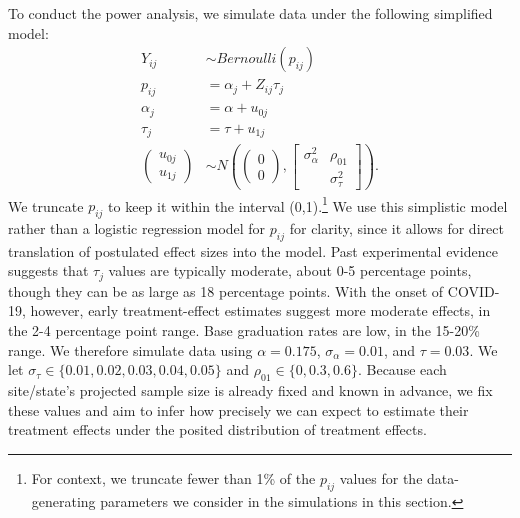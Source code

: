 \documentclass[]{article}
\begin{document}
To conduct the power analysis, we simulate data under the following simplified model:
\begin{align*}
    Y_{ij} &\sim Bernoulli(p_{ij}) \\
    p_{ij} &= \alpha_j + Z_{ij} \tau_j \\
    \alpha_j &= \alpha + u_{0j} \\
	\tau_j &= \tau + u_{1j} \\
	\begin{pmatrix}
		u_{0j} \\ u_{1j}
	\end{pmatrix} &\sim N\left(
	\begin{pmatrix}
		0 \\ 0
	\end{pmatrix}, 
	\begin{bmatrix}
		\sigma^2_\alpha & \rho_{01} \\  & \sigma^2_\tau
	\end{bmatrix}\right).
\end{align*}
We truncate $p_{ij}$ to keep it within the interval (0,1).\footnote{For context, we truncate fewer than 1\% of the $p_{ij}$ values for the data-generating parameters we consider in the simulations in this section.}
We use this simplistic model rather than a logistic regression model for $p_{ij}$ for clarity, since it allows for direct translation of postulated effect sizes into the model.
Past experimental evidence suggests that $\tau_j$ values are typically moderate, about 0-5 percentage points, though they can be as large as 18 percentage points.
With the onset of COVID-19, however, early treatment-effect estimates suggest more moderate effects, in the 2-4 percentage point range.
Base graduation rates are low, in the 15-20\% range.
We therefore simulate data using $\alpha = 0.175$, $\sigma_\alpha=0.01$, and $\tau=0.03$.
We let $\sigma_\tau \in \{0.01, 0.02, 0.03, 0.04, 0.05\}$ and $\rho_{01} \in \{0, 0.3, 0.6\}$.
Because each site/state's projected sample size is already fixed and known in advance, we fix these values and aim to infer how precisely we can expect to estimate their treatment effects under the posited distribution of treatment effects.
\end{document}
